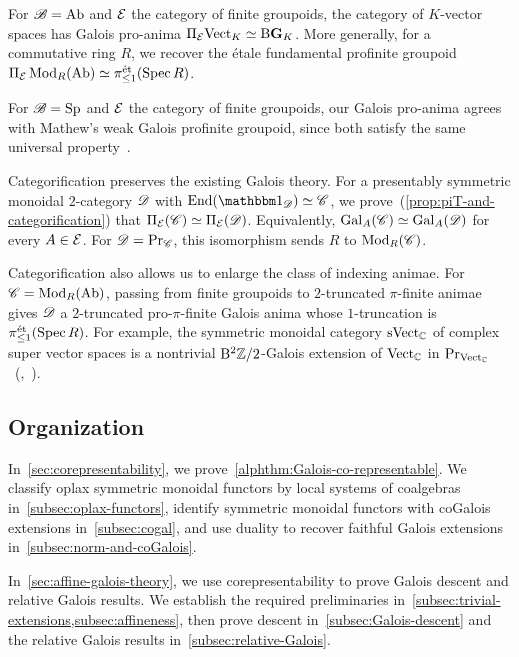 \documentclass[english,svgnames,table]{article}
\begin{document}
    For $\basecat=\Ab$ and $\cT$ the category of finite groupoids, the category of $K$-vector spaces has Galois pro-anima $\piT\Vect_K \simeq \B\G_K$.
    More generally, for a commutative ring $R$, we recover the \'etale fundamental profinite groupoid $\piT \Mod_R(\Ab) \simeq \pi^{\et}_{\le 1}(\Spec R)$.

    For $\basecat = \Sp$ and $\cT$ the category of finite groupoids, our Galois pro-anima agrees with Mathew's weak Galois profinite groupoid, since both satisfy the same universal property~\cite[Definition~6.8 and Proposition~6.13]{Mathew-2016-Galois}.


    Categorification preserves the existing Galois theory.
    For a presentably symmetric monoidal $2$-category $\cD$ with $\End(\ounit_{\cD}) \simeq \cC$, we prove~(\cref{prop:piT-and-categorification}) that $\piT(\cC) \simeq \piT(\cD)$.
    Equivalently, $\Gal_A(\cC) \simeq \Gal_A(\cD)$ for every $A \in \cT$.
    For $\cD=\ModC$, this isomorphism sends $R$ to $\Mod_R(\cC)$.

    Categorification also allows us to enlarge the class of indexing animae.
    For $\cC=\Mod_R(\Ab)$, passing from finite groupoids to $2$-truncated $\pi$-finite animae gives $\cD$ a $2$-truncated pro-$\pi$-finite Galois anima whose $1$-truncation is $\pi^{\et}_{\le 1}(\Spec R)$.
    For example, the symmetric monoidal category $\sVect_{\CC}$ of complex super vector spaces is a nontrivial $\B^2\ZZ/2$-Galois extension of $\Vect_{\CC}$ in $\ModC[\Vect_{\CC}]$~(\cite[Theorem~2.11]{Johson-Freyd-2017-sVect},~\cite[Proposition~5.1.4 and Example~1.3.9]{Keidar-Ragimov-2025-twisted}).

    

\subsection{Organization}
    In~\cref{sec:corepresentability}, we prove~\cref{alphthm:Galois-co-representable}.
    We classify oplax symmetric monoidal functors by local systems of coalgebras in~\cref{subsec:oplax-functors}, identify symmetric monoidal functors with coGalois extensions in~\cref{subsec:cogal}, and use duality to recover faithful Galois extensions in~\cref{subsec:norm-and-coGalois}.

    In~\cref{sec:affine-galois-theory}, we use corepresentability to prove Galois descent and relative Galois results.
    We establish the required preliminaries in~\cref{subsec:trivial-extensions,subsec:affineness}, then prove descent in~\cref{subsec:Galois-descent} and the relative Galois results in~\cref{subsec:relative-Galois}.
\end{document}

